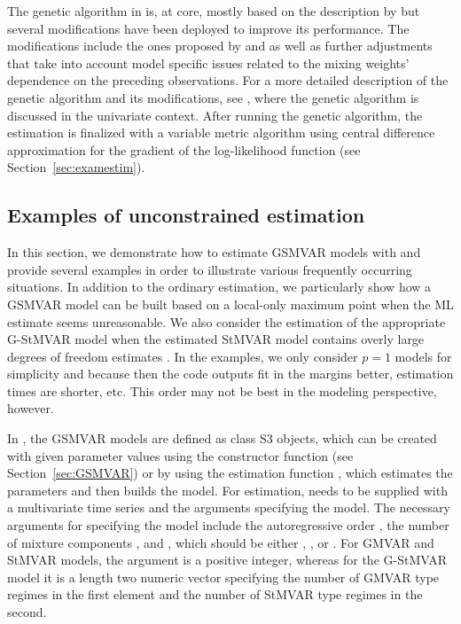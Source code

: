 \documentclass[nojss]{jss}
\begin{document}
The genetic algorithm in  is, at core, mostly based on the description by \cite{Dorsey+Mayer:1995} but several modifications have been deployed to improve its performance. The modifications include the ones proposed by \cite{Patnaik+Srinivas:1994} and \cite{Smith+Dike+Stegmann:1995} as well as further adjustments that take into account model specific issues related to the mixing weights' dependence on the preceding observations. For a more detailed description of the genetic algorithm and its modifications, see \citet[Appendix A]{Virolainen:2021}, where the genetic algorithm is discussed in the univariate context. After running the genetic algorithm, the estimation is finalized with a variable metric algorithm \cite[algorithm 21, implemented by \citealp{R}]{Nash:1990} using central difference approximation for the gradient of the log-likelihood function (see Section~\ref{sec:examestim}).

\subsection{Examples of unconstrained estimation}\label{sec:example_estim}

In this section, we demonstrate how to estimate GSMVAR models with  and provide several examples in order to illustrate various frequently occurring situations. In addition to the ordinary estimation, we particularly show how a GSMVAR model can be built based on a local-only maximum point when the ML estimate seems unreasonable. We also consider the estimation of the appropriate G-StMVAR model when the estimated StMVAR model contains overly large degrees of freedom estimates \citep[see the related discussion in][]{Virolainen2:2021}. In the examples, we only consider $p=1$ models for simplicity and because then the code outputs fit in the margins better, estimation times are shorter, etc. This order may not be best in the modeling perspective, however.

In , the GSMVAR models are defined as class  S3 objects, which can be created with given parameter values using the constructor function  (see Section~\ref{sec:GSMVAR}) or by using the estimation function , which estimates the parameters and then builds the model. For estimation,  needs to be supplied with a multivariate time series and the arguments specifying the model. The necessary arguments for specifying the model include the autoregressive order , the number of mixture components , and , which should be either , , or . For GMVAR and StMVAR models, the argument  is a positive integer, whereas for the G-StMVAR model it is a length two numeric vector specifying the number of GMVAR type regimes in the first element and the number of StMVAR type regimes in the second.
\end{document}
